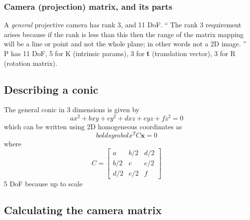 \subsubsection{Camera (projection) matrix, and its parts}
A \textit{general} projective camera has rank 3, and 11 DoF.
``
The rank 3 requirement arises because if the rank is less
than this then the range of the matrix mapping will be a
line or point and not the whole plane; in other words not
a 2D image.
''
P has 11 DoF, 5 for K (intrinsic params), 3 for \textbf{t} (translation
vector), 3 for R (rotation matrix).


\subsection{Describing a conic}

The general conic in 3 dimensions is given by
\[ax^2 + bxy + cy^2 + dxz + eyz + fz^2 = 0\]
which can be written using 2D homogeneous coordinates as
\[boldsymbol{x}^T C \boldsymbol{x} = 0\]
where
\[ C = \begin{bmatrix}
        a   &   b/2     &   d/2     \\
        b/2 &   c       &   e/2     \\
        d/2 &   e/2     &   f       
    \end{bmatrix}
\]
5 DoF because up to scale


\subsection{Calculating the camera matrix}

